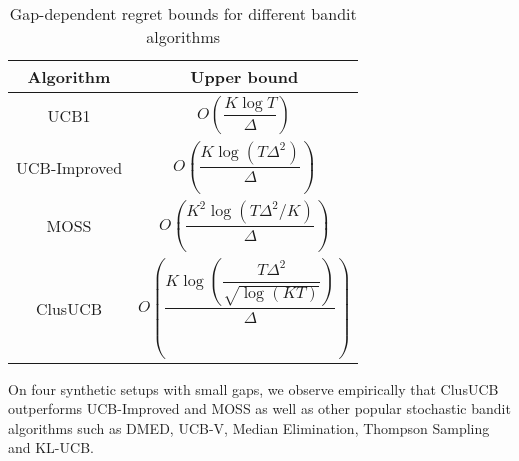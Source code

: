 \begin{table}
\caption{Gap-dependent regret bounds for different bandit algorithms}
\label{tab:regret-bds}
\begin{center}
\begin{tabular}{|c|c|}
\toprule
Algorithm  & Upper bound \\
\midrule
UCB1         &$O\left(\dfrac{K\log T}{\Delta}\right)$ \\\midrule
UCB-Improved &$O\left(\dfrac{K\log (T\Delta^{2})}{\Delta}\right)$ \\\midrule
MOSS	     &$O\left(\dfrac{K^{2}\log\left(T\Delta^{2}/K\right)}{\Delta}\right)$\\\midrule
ClusUCB      &$O\left(\dfrac{K\log\left(\dfrac{T\Delta^{2}}{\sqrt{\log (KT)}}\right)}{\Delta}\right)$\\\bottomrule
\end{tabular}
\end{center}
\end{table}


On four synthetic setups with small gaps, we observe empirically that ClusUCB outperforms UCB-Improved\cite{auer2010ucb} and MOSS\cite{audibert2009minimax} as well as other popular stochastic bandit algorithms such as DMED\cite{honda2010asymptotically}, UCB-V\cite{audibert2009exploration}, Median Elimination\cite{even2006action}, Thompson Sampling\cite{agrawal2011analysis} and KL-UCB\cite{garivier2011kl}.

	
